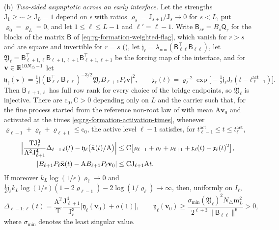 (b) \emph{Two-sided asymptotic across an early interface.} Let the strengths
\(\mathrm J_1\ge\cdots\ge\mathrm J_L=1\) depend on \(\epsilon\) with ratios
\(\varrho_s=\mathrm J_{s+1}/\mathrm J_s\to0\) for \(s<L\), put \(\varrho_0=\varrho_L=0\), and
let \(1\le\ell\le L-1\) and \(\ell'=\ell-1\). Write
\(\mathsf B_{sr}=B_s\mathsf Q_r\) for the blocks of the matrix \(\mathsf B\)
of \cref{eq:rg-formation-weighted-flag}, which vanish for \(r>s\) and are
square and invertible for \(r=s\) (), let
\(\mathfrak j_\ell=\lambda_{\min}(\mathsf B_{\ell\ell}^\top\mathsf B_{\ell\ell})\),
let \(\mathfrak Y_\ell=\mathsf B_{\ell+1,\ell}^\top\mathsf B_{\ell+1,\ell+1}\mathsf B_{\ell+1,\ell+1}^\top\)
be the forcing map of the interface, and for
\(\mathbf v\in\mathbb R^{10N_\triangle-1}\) let
\begin{equation}
\mathfrak y_\ell(\mathbf v)=\tfrac12\bigl|(\mathsf B_{\ell\ell}^\top\mathsf B_{\ell\ell})^{-3/2}
\mathfrak Y_\ell B_{\ell+1}P_\ell\mathbf v\bigr|^2,
\qquad
\mathfrak x_\ell(t)=\varrho_\ell^{-2}\exp\bigl[-\tfrac12\mathfrak j_\ell\mathrm J_\ell(t-t^{\mathrm{act}}_{\ell-1})\bigr].
\label{eq:rg-formation-core-coefficient}
\end{equation}
Then \(\mathsf B_{\ell+1,\ell}\) has full row rank for every choice of the
bridge endpoints, so \(\mathfrak Y_\ell\) is injective. There are
\(\mathrm c_0,\mathrm C>0\) depending only on \(L\) and the carrier such
that, for the fine process started from the reference non-root law of
 with mean \(\mathrm A\mathbf v_0\) and
activated at the times \cref{eq:rg-formation-activation-times}, whenever
\(\varrho_{\ell-1}+\varrho_\ell+\varrho_{\ell+1}\le\mathrm c_0\), the active level \(\ell-1\)
satisfies, for \(t^{\mathrm{act}}_{\ell-1}\le t\le t^{\mathrm{act}}_\ell\),
\begin{equation}
\begin{aligned}
\Bigl|\frac{\mathrm T\mathrm J_\ell^3}{\mathrm A^2\mathrm J_{\ell+1}^4}
\Delta_{\ell-1:\ell}(t)-\mathfrak y_\ell\bigl(\bar{\mathbf x}(t)/\mathrm A\bigr)\Bigr|
&\le\mathrm C\bigl[\varrho_{\ell-1}+\varrho_\ell+\varrho_{\ell+1}+\mathfrak x_\ell(t)+\mathfrak x_\ell(t)^2\bigr],\\
|B_{\ell+1}P_\ell\bar{\mathbf x}(t)-\mathrm AB_{\ell+1}P_\ell\mathbf v_0|
&\le\mathrm C\mathrm J_{\ell+1}\mathrm At.
\end{aligned}
\label{eq:rg-formation-core-two-sided}
\end{equation}
If moreover \(k_L\log(1/\epsilon)\varrho_\ell\to0\) and
\(\tfrac12\mathfrak j_\ell k_L\log(1/\epsilon)(1-2\varrho_{\ell-1})-2\log(1/\varrho_\ell)\to\infty\),
then, uniformly on \(I_\ell\),
\begin{equation}
\Delta_{\ell-1:\ell}(t)
=\frac{\mathrm A^2}{\mathrm T}\frac{\mathrm J_{\ell+1}^4}{\mathrm J_\ell^3}
\bigl[\mathfrak y_\ell(\mathbf v_0)+o(1)\bigr],
\qquad
\mathfrak y_\ell(\mathbf v_0)
\ge\frac{\sigma_{\min}(\mathfrak Y_\ell)^2N_\triangle\mathrm m_L^2}{2^{\ell+3}\|\mathsf B_{\ell\ell}\|^6}>0,
\label{eq:rg-formation-core-window}
\end{equation}
where \(\sigma_{\min}\) denotes the least singular value.

